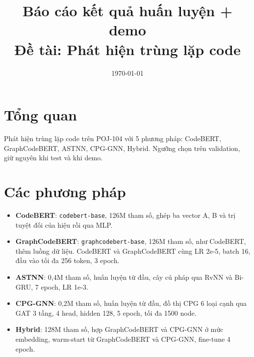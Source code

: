 \documentclass[11pt,a4paper]{article}
\title{\vspace{-1.0cm}\textbf{Báo cáo kết quả huấn luyện + demo}\\[4pt]
       {\normalsize Đề tài: Phát hiện trùng lặp code}}
\date{\today}
\begin{document}
\maketitle
\vspace{-0.8cm}

\section{Tổng quan}
Phát hiện trùng lặp code trên POJ-104 với 5 phương pháp:
CodeBERT, GraphCodeBERT, ASTNN, CPG-GNN, Hybrid.
Ngưỡng chọn trên validation, giữ nguyên khi test và khi demo.

\section{Các phương pháp}
\begin{itemize}[leftmargin=*,itemsep=0pt,topsep=2pt,parsep=0pt]
\item \textbf{CodeBERT}: \texttt{codebert-base}, 126M tham số,
  ghép ba vector A, B và trị tuyệt đối của hiệu rồi qua MLP.
\item \textbf{GraphCodeBERT}: \texttt{graphcodebert-base}, 126M tham số,
  như CodeBERT, thêm luồng dữ liệu. CodeBERT và GraphCodeBERT cùng LR 2e-5, batch 16,
  đầu vào tối đa 256 token, 3 epoch.
\item \textbf{ASTNN}: 0,4M tham số, huấn luyện từ đầu,
  cây cú pháp qua RvNN và Bi-GRU, 7 epoch, LR 1e-3.
\item \textbf{CPG-GNN}: 0,2M tham số, huấn luyện từ đầu,
  đồ thị CPG 6 loại cạnh qua GAT 3 tầng, 4 head, hidden 128,
  5 epoch, tối đa 1500 node.
\item \textbf{Hybrid}: 128M tham số, hợp GraphCodeBERT và CPG-GNN
  ở mức embedding, warm-start từ GraphCodeBERT và CPG-GNN, fine-tune 4 epoch.
\end{itemize}
\end{document}
